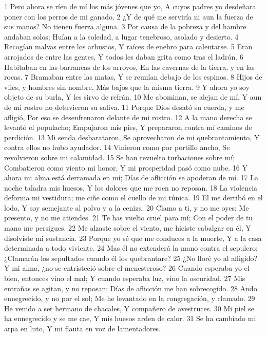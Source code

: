 1 Pero ahora se ríen de mí los más jóvenes que yo,  
A cuyos padres yo desdeñara poner con los perros de mi ganado.  
2 ¿Y de qué me serviría ni aun la fuerza de sus manos?  
No tienen fuerza alguna.  
3 Por causa de la pobreza y del hambre andaban solos;  
Huían a la soledad, a lugar tenebroso, asolado y desierto.  
4 Recogían malvas entre los arbustos,  
Y raíces de enebro para calentarse.  
5 Eran arrojados de entre las gentes,  
Y todos les daban grita como tras el ladrón.  
6 Habitaban en las barrancas de los arroyos,  
En las cavernas de la tierra, y en las rocas.  
7 Bramaban entre las matas,  
Y se reunían debajo de los espinos.  
8 Hijos de viles, y hombres sin nombre,  
Más bajos que la misma tierra.  
9 Y ahora yo soy objeto de su burla,  
Y les sirvo de refrán.  
10 Me abominan, se alejan de mí,  
Y aun de mi rostro no detuvieron su saliva.  
11 Porque Dios desató su cuerda, y me afligió, 
Por eso se desenfrenaron delante de mi rostro.  
12 A la mano derecha se levantó el populacho;  
Empujaron mis pies,  
Y prepararon contra mí caminos de perdición.  
13 Mi senda desbarataron,  
Se aprovecharon de mi quebrantamiento,  
Y contra ellos no hubo ayudador.  
14 Vinieron como por portillo ancho,  
Se revolvieron sobre mi calamidad.  
15 Se han revuelto turbaciones sobre mí;  
Combatieron como viento mi honor,  
Y mi prosperidad pasó como nube.  
16 Y ahora mi alma está derramada en mí;  
Días de aflicción se apoderan de mí.  
17 La noche taladra mis huesos,  
Y los dolores que me roen no reposan.  
18 La violencia deforma mi vestidura; me ciñe como el cuello de mi túnica.  
19 El me derribó en el lodo,  
Y soy semejante al polvo y a la ceniza.  
20 Clamo a ti, y no me oyes;  
Me presento, y no me atiendes.  
21 Te has vuelto cruel para mí;  
Con el poder de tu mano me persigues.  
22 Me alzaste sobre el viento, me hiciste cabalgar en él,  
Y disolviste mi sustancia.  
23 Porque yo sé que me conduces a la muerte,  
Y a la casa determinada a todo viviente.  
24 Mas él no extenderá la mano contra el sepulcro;  
¿Clamarán los sepultados cuando él los quebrantare?  
25 ¿No lloré yo al afligido?  
Y mi alma, ¿no se entristeció sobre el menesteroso?  
26 Cuando esperaba yo el bien, entonces vino el mal;  
Y cuando esperaba luz, vino la oscuridad.  
27 Mis entrañas se agitan, y no reposan;  
Días de aflicción me han sobrecogido.  
28 Ando ennegrecido, y no por el sol;  
Me he levantado en la congregación, y clamado.  
29 He venido a ser hermano de chacales,  
Y compañero de avestruces.  
30 Mi piel se ha ennegrecido y se me cae,  
Y mis huesos arden de calor.  
31 Se ha cambiado mi arpa en luto,  
Y mi flauta en voz de lamentadores.  

